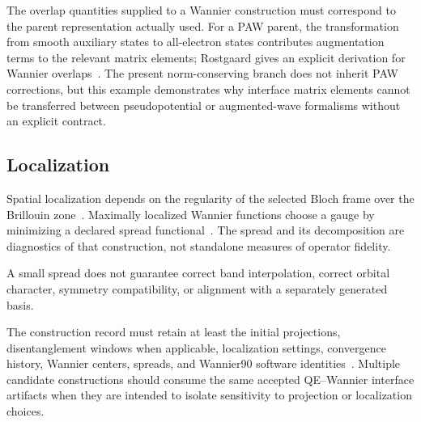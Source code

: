 
The overlap quantities supplied to a Wannier construction must correspond to
the parent representation actually used. For a PAW parent, the transformation
from smooth auxiliary states to all-electron states contributes augmentation
terms to the relevant matrix elements; Rostgaard gives an explicit derivation
for Wannier overlaps~\cite{rostgaard2009}. The present norm-conserving branch
does not inherit PAW corrections, but this example demonstrates why interface
matrix elements cannot be transferred between pseudopotential or augmented-wave
formalisms without an explicit contract.


\subsection{Localization}


Spatial localization depends on the regularity of the selected Bloch frame over
the Brillouin zone~\cite{kohn1959}. Maximally localized Wannier functions choose
a gauge by minimizing a declared spread functional~\cite{marzari2012}. The
spread and its decomposition are
diagnostics of that construction, not standalone measures of operator fidelity.

A small spread does not guarantee correct band interpolation, correct orbital
character, symmetry compatibility, or alignment with a separately generated
basis.

The construction record must retain at least the initial projections,
disentanglement windows when applicable, localization settings, convergence
history, Wannier centers, spreads, and Wannier90 software
identities~\cite{pizzi2020}. Multiple candidate
constructions should consume the same accepted QE--Wannier interface artifacts
when they are intended to isolate sensitivity to projection or localization
choices.

